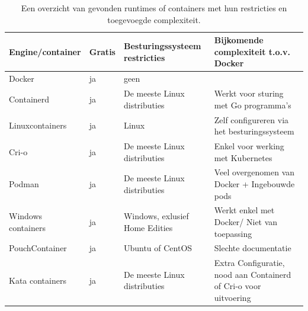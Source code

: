 \begin{center}
    \begin{table}
    \begin{tabular}{ m{3.5cm} || m{1cm} | m{3.3cm} | m{4.5cm} }
        Engine/container & Gratis & Besturingssysteem restricties & Bijkomende complexiteit t.o.v. Docker \\ 
        \hline
        Docker & ja & geen &  \\  
        \hline
        Containerd & ja & De meeste Linux distributies & Werkt voor sturing met Go programma’s \\
        \hline 
        Linuxcontainers & ja & Linux & Zelf configureren via het besturingssysteem \\
        \hline
        Cri-o & ja & De meeste Linux distributies & Enkel voor werking met Kubernetes \\
        \hline
        Podman & ja & De meeste Linux distributies & Veel overgenomen van Docker + Ingebouwde pods \\
        \hline
        Windows containers & ja & Windows, exlusief Home Edities & Werkt enkel met Docker/ Niet van toepassing \\
        \hline
        PouchContainer & ja & Ubuntu of CentOS & Slechte documentatie \\
        \hline
        Kata containers & ja & De meeste Linux distributies & Extra Configuratie, nood aan Containerd of Cri-o voor uitvoering \\
    \end{tabular}
    \caption[Overzicht Runtimes en containers]{Een overzicht van gevonden runtimes of containers met hun restricties en toegevoegde complexiteit.}
    \label{tab:Engines}
    \end{table}
\end{center}

